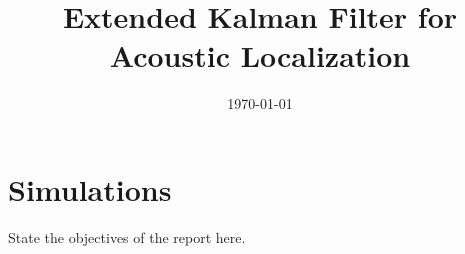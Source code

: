 \documentclass[a4paper,12pt]{article}
\begin{document}
\title{Extended Kalman Filter for Acoustic Localization}
\date{\today}
\maketitle



\section{Simulations}
State the objectives of the report here.
\end{document}
